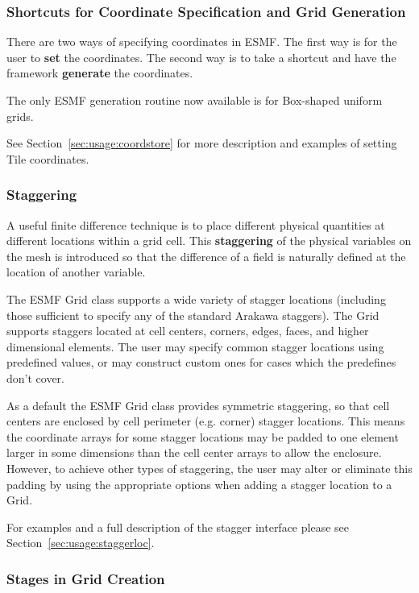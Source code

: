 {\subsubsection{Shortcuts for Coordinate Specification and Grid Generation}

There are two ways of specifying coordinates in ESMF.  The
first way is for the user to {\bf set} the coordinates.  The second 
way is to take a shortcut and have the framework {\bf generate}
the coordinates.  

The only ESMF generation routine now available is for Box-shaped
uniform grids.

See Section~\ref{sec:usage:coordstore} for more description and examples of
setting Tile coordinates.

\subsubsection{Staggering}

A useful finite difference technique is to place different physical
quantities at different locations within a grid cell. This {\bf staggering}
of the physical variables on the mesh is introduced so that the difference
of a field is naturally defined at the location of another variable. 

The ESMF Grid class supports a wide variety of stagger locations (including
those sufficient to specify any of the standard Arakawa staggers). The 
Grid supports staggers located at cell centers, corners, edges, 
faces, and higher dimensional elements. The user may specify
common stagger locations using predefined values, or may construct
custom ones for cases which the predefines don't cover.

As a default the ESMF Grid class provides symmetric staggering, so
that cell centers are enclosed by cell perimeter (e.g. corner) 
stagger locations. This means the coordinate arrays for
some stagger locations may be padded to one element larger in some
dimensions than the cell center arrays to allow the enclosure. 
However, to achieve other types of staggering, the user may alter 
or eliminate this padding by using the appropriate options when adding
a stagger location to a Grid. 
 
For examples and a full description of the stagger interface 
please see Section~\ref{sec:usage:staggerloc}. 

\subsubsection{Stages in Grid Creation} 

}
